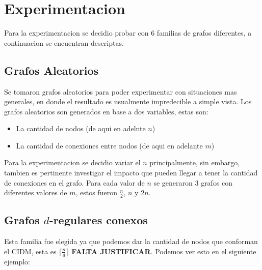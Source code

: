 \section{Experimentacion}

Para la experimentacion se decidio probar con 6 familias de grafos diferentes, a continuacion se encuentran descriptas.
\subsection{Grafos Aleatorios}

Se tomaron grafos aleatorios para poder experimentar con situaciones mas generales, en donde el resultado es usualmente impredecible a simple vista. Los grafos aleatorios son generados en base a dos variables, estas son:

\begin{itemize}
	\item La cantidad de nodos (de aqui en adelnte $n$)
	\item La cantidad de conexiones entre nodos (de aqui en adelante $m$)
\end{itemize}

Para la experimentacion se decidio variar el $n$ principalmente, sin embargo, tambien es pertinente investigar el impacto que pueden llegar a tener la cantidad de conexiones en el grafo. Para cada valor de $n$ se generaron 3 grafos con diferentes valores de $m$, estos fueron $\frac{n}{2}$, $n$ y $2n$.

\subsection{Grafos $d$-regulares conexos}

Esta familia fue elegida ya que podemos dar la cantidad de nodos que conforman el CIDM, esta es $\lceil\frac{n}{d}\rceil$ \textbf{FALTA JUSTIFICAR}. Podemos ver esto en el siguiente ejemplo:

